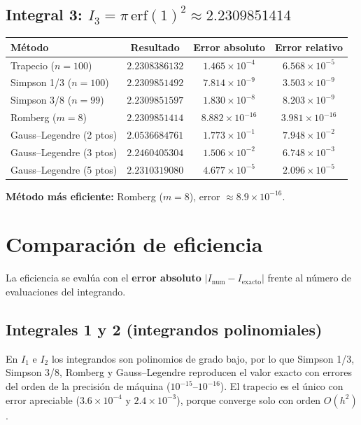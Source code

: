 \documentclass[12pt,a4paper]{article}
\begin{document}
\subsection{Integral 3: $I_3=\pi\,\mathrm{erf}(1)^2\approx 2.2309851414$}
\begin{center}
\begin{tabular}{l c c c}
\toprule
Método & Resultado & Error absoluto & Error relativo \\
\midrule
Trapecio ($n=100$)       & $2.2308386132$ & $1.465\times10^{-4}$ & $6.568\times10^{-5}$ \\
Simpson 1/3 ($n=100$)    & $2.2309851492$ & $7.814\times10^{-9}$ & $3.503\times10^{-9}$ \\
Simpson 3/8 ($n=99$)     & $2.2309851597$ & $1.830\times10^{-8}$ & $8.203\times10^{-9}$ \\
Romberg ($m=8$)          & $2.2309851414$ & $8.882\times10^{-16}$ & $3.981\times10^{-16}$ \\
Gauss--Legendre (2 ptos) & $2.0536684761$ & $1.773\times10^{-1}$ & $7.948\times10^{-2}$ \\
Gauss--Legendre (3 ptos) & $2.2460405304$ & $1.506\times10^{-2}$ & $6.748\times10^{-3}$ \\
Gauss--Legendre (5 ptos) & $2.2310319080$ & $4.677\times10^{-5}$ & $2.096\times10^{-5}$ \\
\bottomrule
\end{tabular}
\end{center}
\textbf{Método más eficiente:} Romberg ($m=8$), error $\approx 8.9\times10^{-16}$.
\section{Comparación de eficiencia}
La eficiencia se evalúa con el \textbf{error absoluto} $|I_{\text{num}}-I_{\text{exacto}}|$
frente al número de evaluaciones del integrando.

\subsection{Integrales 1 y 2 (integrandos polinomiales)}
En $I_1$ e $I_2$ los integrandos son polinomios de grado bajo, por lo que
Simpson 1/3, Simpson 3/8, Romberg y Gauss--Legendre reproducen el valor exacto
con errores del orden de la precisión de máquina ($10^{-15}$--$10^{-16}$). El
trapecio es el único con error apreciable ($3.6\times10^{-4}$ y
$2.4\times10^{-3}$), porque converge solo con orden $O(h^2)$.
\end{document}

